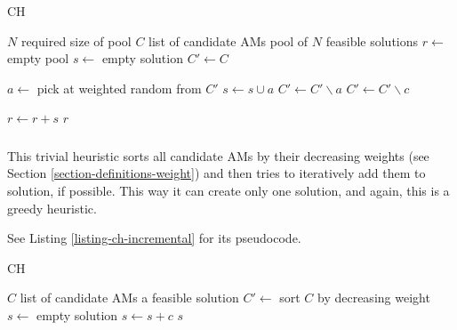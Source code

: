 \begin{algorithm}
\caption{ CH}
\label{listing-ch-fuzzy}
\begin{algorithmic}
\REQUIRE $N$ required size of pool
\REQUIRE $C$ list of candidate AMs
\ENSURE pool of $N$ feasible solutions
\STATE $r \gets $ empty pool
  \STATE {}
  \STATE $s \gets $ empty solution
  \STATE $C' \gets C$

    \STATE $a \gets $ pick at weighted random from $C'$
      \STATE $s \gets s \cup a$
      \STATE $C' \gets C' \backslash a$
    \ENDIF
        \STATE {}
        \STATE $C' \gets C' \backslash c$
      \ENDIF
    \ENDFOR
  \ENDWHILE

  \STATE $r \gets r + s$
\ENDFOR
\RETURN $r$
\end{algorithmic}
\end{algorithm}

\subsubsection{}

This trivial heuristic sorts all candidate AMs by their decreasing weights (see Section \ref{section-definitions-weight}) and then tries to iteratively add them to solution, if possible. This way it can create only one solution, and again, this is a greedy heuristic.

See Listing \ref{listing-ch-incremental} for its pseudocode.

\begin{algorithm}
\caption{ CH}
\label{listing-ch-incremental}
\begin{algorithmic}
\REQUIRE $C$ list of candidate AMs
\ENSURE a feasible solution
\STATE $C' \gets $ sort $C$ by decreasing weight
\STATE $s \gets $ empty solution
    \STATE $s \gets s + c$
  \ENDIF
\ENDFOR
\RETURN $s$
\end{algorithmic}
\end{algorithm}

\subsubsection{}


